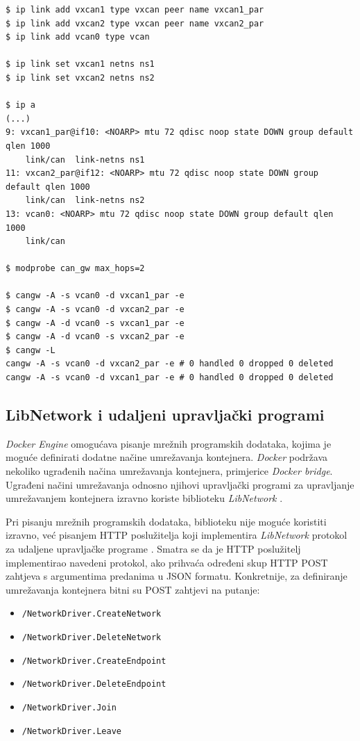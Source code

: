 \documentclass[times, utf8, diplomski, numeric]{fer}
\begin{document}
\newpage
\begin{lstlisting}[style=terminal, label={lst:vxcan2},caption={Povezivanje mrežnih imenskih prostora alatom \textit{cangw}}]
$ ip link add vxcan1 type vxcan peer name vxcan1_par
$ ip link add vxcan2 type vxcan peer name vxcan2_par
$ ip link add vcan0 type vcan

$ ip link set vxcan1 netns ns1
$ ip link set vxcan2 netns ns2

$ ip a
(...)
9: vxcan1_par@if10: <NOARP> mtu 72 qdisc noop state DOWN group default qlen 1000
    link/can  link-netns ns1
11: vxcan2_par@if12: <NOARP> mtu 72 qdisc noop state DOWN group default qlen 1000
    link/can  link-netns ns2
13: vcan0: <NOARP> mtu 72 qdisc noop state DOWN group default qlen 1000
    link/can 

$ modprobe can_gw max_hops=2

$ cangw -A -s vcan0 -d vxcan1_par -e
$ cangw -A -s vcan0 -d vxcan2_par -e
$ cangw -A -d vcan0 -s vxcan1_par -e
$ cangw -A -d vcan0 -s vxcan2_par -e
$ cangw -L
cangw -A -s vcan0 -d vxcan2_par -e # 0 handled 0 dropped 0 deleted
cangw -A -s vcan0 -d vxcan1_par -e # 0 handled 0 dropped 0 deleted
\end{lstlisting}

\subsection{LibNetwork i udaljeni upravljački programi}
\textit{Docker Engine} omogućava pisanje mrežnih programskih dodataka, kojima je moguće definirati dodatne načine umrežavanja kontejnera. \textit{Docker} podržava nekoliko ugrađenih načina umrežavanja kontejnera, primjerice \textit{Docker bridge}. Ugrađeni načini umrežavanja odnosno njihovi upravljački programi za upravljanje umrežavanjem kontejnera izravno koriste biblioteku \textit{LibNetwork} \cite{libnetwork}.

Pri pisanju mrežnih programskih dodataka, biblioteku nije moguće koristiti izravno, već pisanjem HTTP poslužitelja koji implementira \textit{LibNetwork} protokol za udaljene upravljačke programe . Smatra se da je HTTP poslužitelj implementirao navedeni protokol, ako prihvaća određeni skup HTTP POST zahtjeva s argumentima predanima u JSON formatu. Konkretnije, za definiranje umrežavanja kontejnera bitni su POST zahtjevi na putanje: 
\bigskip
\begin{itemize}
    \item \texttt{/NetworkDriver.CreateNetwork}
    \item \texttt{/NetworkDriver.DeleteNetwork}
    \item \texttt{/NetworkDriver.CreateEndpoint}
    \item \texttt{/NetworkDriver.DeleteEndpoint}
    \item \texttt{/NetworkDriver.Join}
    \item \texttt{/NetworkDriver.Leave}
\end{itemize}
\end{document}
